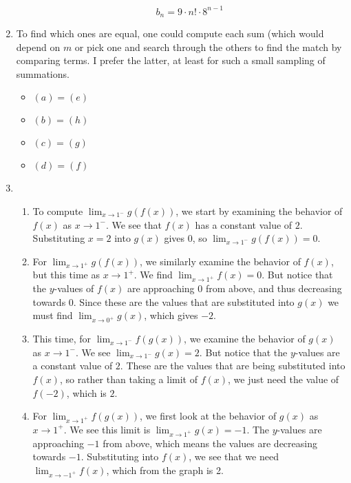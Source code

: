 \documentclass{article}
\begin{document}
\begin{enumerate}
\begin{enumerate}
            \[b_n=9\cdot n!\cdot 8^{n-1}\]
        \end{enumerate}
        \item To find which ones are equal, one could compute each sum (which would depend on $m$ or pick one and search through the others to find the match by comparing terms.  I prefer the latter, at least for such a small sampling of summations. 
        \begin{itemize}
            \item $(a)=(e)$
            \item $(b)=(h)$
            \item $(c)=(g)$
            \item $(d)=(f)$
        \end{itemize}
        \item 
        \begin{enumerate}
            \item To compute $\displaystyle \lim_{x\rightarrow 1^-} g(f(x))$, we start by examining the behavior of $f(x)$ as $x\rightarrow 1^-$. We see that $f(x)$ has a constant value of $2$. Substituting $x=2$ into $g(x)$ gives $0$, so $\displaystyle \lim_{x\rightarrow 1^-} g(f(x)) = 0$.
            \item For $\lim_{x\rightarrow 1^+} g(f(x))$, we similarly examine the behavior of $f(x)$, but this time as $x\rightarrow 1^+$. We find $\lim_{x\rightarrow 1^+} f(x) = 0$. But notice that the $y$-values of $f(x)$ are approaching $0$ from above, and thus decreasing towards 0. Since these are the values that are substituted into $g(x)$ we must find
            $\lim_{x\rightarrow 0^+}g(x)$, which gives $-2$.
            \item This time, for $\lim_{x\rightarrow 1^-} f(g(x))$, we examine the behavior of $g(x)$ as $x\rightarrow1^-$. We see $\lim_{x\rightarrow 1^-} g(x) = 2$. But notice that the $y$-values are a constant value of $2$. These are the values that are being substituted into $f(x)$, so rather than taking a limit of $f(x)$, we just need the value of $f(-2)$, which is $2$.
            \item For $\lim_{x\rightarrow 1^+} f(g(x))$, we first look at the behavior of $g(x)$ as $x\rightarrow 1^+$. We see this limit is $\lim_{x\rightarrow 1^+} g(x) = -1$. The $y$-values are approaching $-1$ from above, which means the values are decreasing towards $-1$. Substituting into $f(x)$, we see that we need $\lim_{x\rightarrow -1^+} f(x)$, which from the graph is 2.
        \end{enumerate}
    \end{enumerate}
\end{document}
